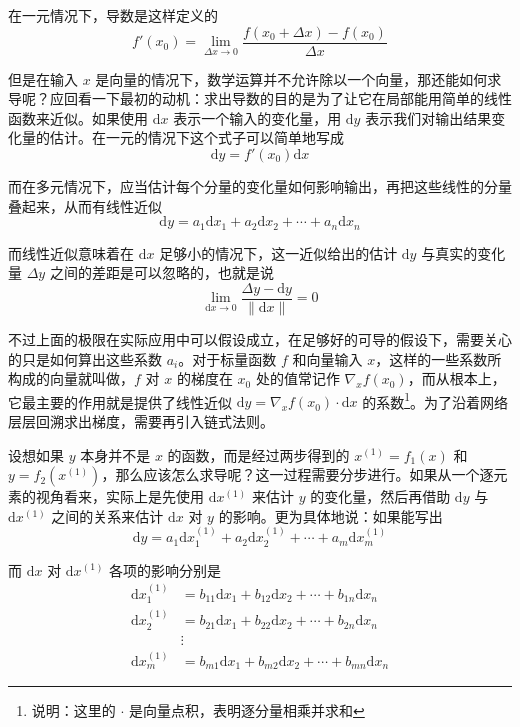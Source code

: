 在一元情况下，导数是这样定义的
\[
    f'(x_0) = \lim_{\Delta x\to 0} \frac{f(x_0 + \Delta x) - f(x_0)}{\Delta x}
\]

但是在输入 $x$ 是向量的情况下，数学运算并不允许除以一个向量，那还能如何求导呢？应回看一下最初的动机：求出导数的目的是为了让它在局部能用简单的线性函数来近似。如果使用 $\mathrm{d}x$ 表示一个输入的变化量，用 $\mathrm{d}y$ 表示我们对输出结果变化量的估计。在一元的情况下这个式子可以简单地写成
\[
    \mathrm{d}y = f'(x_0) \mathrm{d}x
\]

而在多元情况下，应当估计每个分量的变化量如何影响输出，再把这些线性的分量叠起来，从而有线性近似
\[
    \mathrm{d}y = a_1 \mathrm{d}x_1 + a_2 \mathrm{d}x_2 + \cdots + a_n \mathrm{d}x_n
\]

而线性近似意味着在 $\mathrm{d}x$ 足够小的情况下，这一近似给出的估计 $\mathrm{d}y$ 与真实的变化量 $\Delta y$ 之间的差距是可以忽略的，也就是说
\[
    \lim_{\mathrm{d}x\to 0} \frac{\Delta y - \mathrm{d}y}{\|\mathrm{d}x\|} = 0
\]

不过上面的极限在实际应用中可以假设成立，在足够好的可导的假设下，需要关心的只是如何算出这些系数 $a_i$。对于标量函数 $f$ 和向量输入 $x$，这样的一些系数所构成的向量就叫做，$f$ 对 $x$ 的梯度在 $x_0$ 处的值常记作 $\nabla_x f(x_0)$，而从根本上，它最主要的作用就是提供了线性近似 $\mathrm{d}y = \nabla_x f(x_0) \cdot \mathrm{d}x$ 的系数\footnote{说明：这里的 $\cdot$ 是向量点积，表明逐分量相乘并求和}。为了沿着网络层层回溯求出梯度，需要再引入链式法则。

设想如果 $y$ 本身并不是 $x$ 的函数，而是经过两步得到的 $x^{(1)} = f_1(x)$ 和 $y = f_2(x^{(1)})$，那么应该怎么求导呢？这一过程需要分步进行。如果从一个逐元素的视角看来，实际上是先使用 $\mathrm{d}x^{(1)}$ 来估计 $y$ 的变化量，然后再借助 $\mathrm{d}y$ 与 $\mathrm{d}x^{(1)}$ 之间的关系来估计 $\mathrm{d}x$ 对 $y$ 的影响。更为具体地说：如果能写出
\[
    \mathrm{d}y = a_1 \mathrm{d}x^{(1)}_1 + a_2 \mathrm{d}x^{(1)}_2 + \cdots + a_m \mathrm{d}x^{(1)}_m
\]

而 $\mathrm{d}x$ 对 $\mathrm{d}x^{(1)}$ 各项的影响分别是
\[
    \begin{aligned}
        \mathrm{d}x^{(1)}_1 & = b_{11} \mathrm{d}x_1 + b_{12} \mathrm{d}x_2 + \cdots + b_{1n} \mathrm{d}x_n \\
        \mathrm{d}x^{(1)}_2 & = b_{21} \mathrm{d}x_1 + b_{22} \mathrm{d}x_2 + \cdots + b_{2n} \mathrm{d}x_n \\
                            & \vdots                                                                        \\
        \mathrm{d}x^{(1)}_m & = b_{m1} \mathrm{d}x_1 + b_{m2} \mathrm{d}x_2 + \cdots + b_{mn} \mathrm{d}x_n
    \end{aligned}
\]

